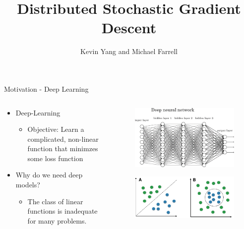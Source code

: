 \documentclass{beamer}
\title{ Distributed Stochastic Gradient Descent }
\author{Kevin Yang and Michael Farrell}
\begin{document}
\begin{frame}
  \titlepage
\end{frame}

\begin{frame}{Motivation - Deep Learning}

\begin{columns}[T] %
\begin{column}{.48\textwidth}
\begin{itemize}
\item Deep-Learning
\begin{itemize}
\item Objective: Learn a complicated, non-linear function that minimzes some loss function
\end{itemize}
\item Why do we need deep models?
\begin{itemize}
\item The class of linear functions is inadequate for many problems.
\end{itemize}
\end{itemize}
\end{column}%
\hfill%
\begin{column}{.48\textwidth}
\begin{figure}
    \includegraphics[scale = .35]{./img/deep_learning}
      \caption{}
\end{figure}
\begin{figure}
    \includegraphics[scale = .17]{./img/lin_v_nonlin}
      \caption{}
\end{figure}
\end{column}%
\end{columns}
\end{frame}
\end{document}
